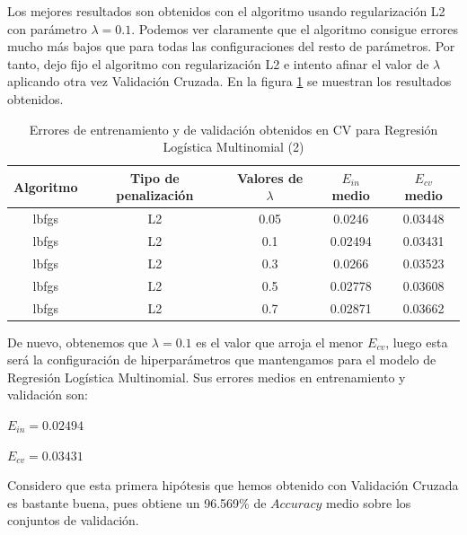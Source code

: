 \documentclass[10pt,a4paper]{article}
\begin{document}
Los mejores resultados son obtenidos con el algoritmo  usando regularización L2 con parámetro $\lambda = 0.1$. Podemos ver claramente que el algoritmo  consigue errores mucho más bajos que  para todas las configuraciones del resto de parámetros. Por tanto, dejo fijo el algoritmo  con regularización L2 e intento afinar el valor de $\lambda$ aplicando otra vez Validación Cruzada. En la figura \ref{fig:cla_mlr_cv2} se muestran los resultados obtenidos.

\begin{table}[h]
	\centering
	\begin{tabular}{|c|c|c|c|c|}
		\hline
		\textbf{Algoritmo} & \textbf{Tipo de penalización} & \textbf{Valores de $\lambda$} & \textbf{$E_{in}$ medio} & \textbf{$E_{cv}$ medio} \\ \hline
		lbfgs              & L2                            & 0.05                          & 0.0246                  & 0.03448                 \\ \hline
		lbfgs              & L2                            & 0.1                           & 0.02494                 & 0.03431                 \\ \hline
		lbfgs              & L2                            & 0.3                           & 0.0266                  & 0.03523                 \\ \hline
		lbfgs              & L2                            & 0.5                           & 0.02778                 & 0.03608                 \\ \hline
		lbfgs              & L2                            & 0.7                           & 0.02871                 & 0.03662                 \\ \hline
	\end{tabular}
	\caption{Errores de entrenamiento y de validación obtenidos en CV para Regresión Logística Multinomial (2)}
	\label{fig:cla_mlr_cv2}
\end{table}


De nuevo, obtenemos que $\lambda = 0.1$ es el valor que arroja el menor $E_{cv}$, luego esta será la configuración de hiperparámetros que mantengamos para el modelo de Regresión Logística Multinomial. Sus errores medios en entrenamiento y validación son:

$E_{in} = 0.02494$

$E_{cv} = 0.03431$

Considero que esta primera hipótesis que hemos obtenido con Validación Cruzada es bastante buena, pues obtiene un 96.569\% de $Accuracy$ medio sobre los conjuntos de validación.
\end{document}
